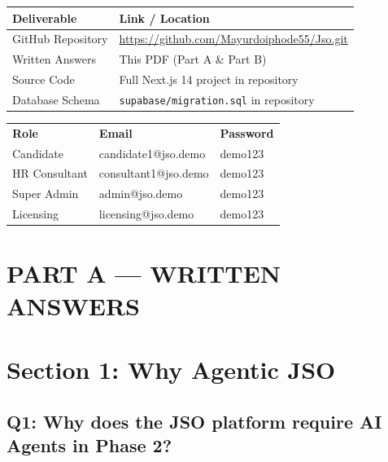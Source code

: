 \documentclass[11pt, a4paper]{article}
\begin{document}
\begin{tabularx}{\textwidth}{l X}
\toprule
\textbf{Deliverable} & \textbf{Link / Location} \\
\midrule
GitHub Repository & \url{https://github.com/Mayurdoiphode55/Jso.git} \\
Written Answers & This PDF (Part A \& Part B) \\
Source Code & Full Next.js 14 project in repository \\
Database Schema & \texttt{supabase/migration.sql} in repository \\
\bottomrule
\end{tabularx}

\begin{tcolorbox}[colback=codebg, colframe=gray!30, boxrule=0.5pt, arc=3pt, title={\small\bfseries Demo Credentials}]
\small
\begin{tabular}{lll}
\textbf{Role} & \textbf{Email} & \textbf{Password} \\
Candidate & candidate1@jso.demo & demo123 \\
HR Consultant & consultant1@jso.demo & demo123 \\
Super Admin & admin@jso.demo & demo123 \\
Licensing & licensing@jso.demo & demo123 \\
\end{tabular}
\end{tcolorbox}

\newpage

\section*{\LARGE PART A — WRITTEN ANSWERS}

\section{Section 1: Why Agentic JSO}

\subsection{Q1: Why does the JSO platform require AI Agents in Phase 2?}
\end{document}
